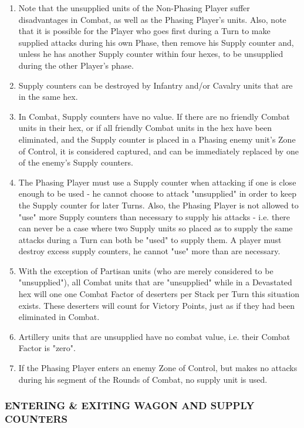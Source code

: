 \begin{enumerate}
  \item Note that the unsupplied units of the Non-Phasing Player suffer disadvantages in Combat, as well as the Phasing Player's units. Also, note that it is possible for the Player who goes first during a Turn to make supplied attacks during his own Phase, then remove his Supply counter and, unless he has another Supply counter within four hexes, to be unsupplied during the other Player's phase.

  \item Supply counters can be destroyed by Infantry and/or Cavalry units that are in the same hex.

  \item In Combat, Supply counters have no value. If there are no friendly Combat units in their hex, or if all friendly Combat units in the hex have been eliminated, and the Supply counter is placed in a Phasing enemy unit's Zone of Control, it is considered captured, and can be immediately replaced by one of the enemy's Supply counters.

  \item The Phasing Player must use a Supply counter when attacking if one is close enough to be used - he cannot choose to attack "unsupplied" in order to keep the Supply counter for later Turns. Also, the Phasing Player is not allowed to "use" more Supply counters than necessary to supply his attacks - i.e. there can never be a case where two Supply units so placed as to supply the same attacks during a Turn can both be "used" to supply them. A player must destroy excess supply counters, he cannot "use" more than are necessary.

  \item With the exception of Partisan units (who are merely considered to be "unsupplied"), all Combat units that are "unsupplied" while in a Devastated hex will one one Combat Factor of deserters per Stack per Turn this situation exists. These deserters will count for Victory Points, just as if they had been eliminated in Combat.

  \item Artillery units that are unsupplied have no combat value, i.e. their Combat Factor is "zero".

  \item If the Phasing Player enters an enemy Zone of Control, but makes no attacks during his segment of the Rounds of Combat, no supply unit is used.
\end{enumerate}

\subsubsection{ENTERING \& EXITING WAGON AND SUPPLY COUNTERS}

